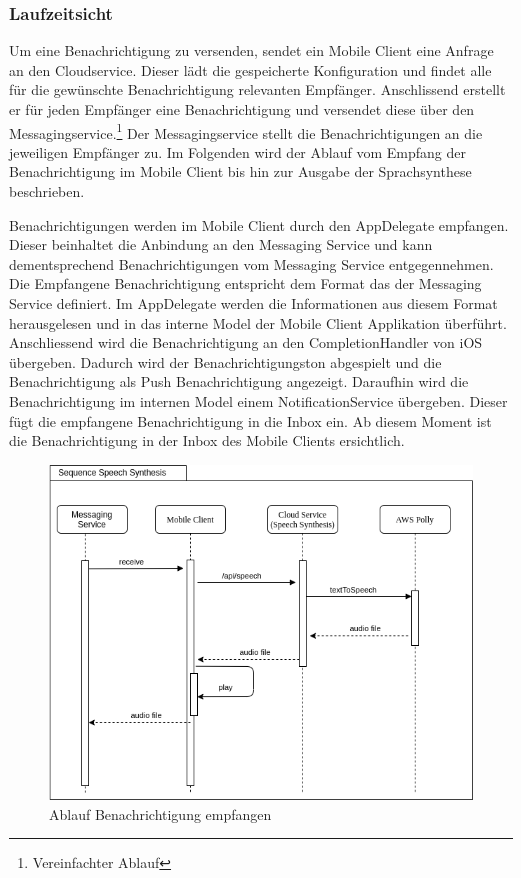 \clearpage
\subsubsection{Laufzeitsicht}

Um eine Benachrichtigung zu versenden, sendet ein Mobile Client eine Anfrage an den Cloudservice.
Dieser lädt die gespeicherte Konfiguration und findet alle für die gewünschte Benachrichtigung relevanten Empfänger.
Anschlissend erstellt er für jeden Empfänger eine Benachrichtigung und versendet diese über den Messagingservice.\cite{ip5}\footnote{Vereinfachter Ablauf}
Der Messagingservice stellt die Benachrichtigungen an die jeweiligen Empfänger zu.
Im Folgenden wird der Ablauf vom Empfang der Benachrichtigung im Mobile Client bis hin zur Ausgabe der Sprachsynthese beschrieben.

Benachrichtigungen werden im Mobile Client durch den AppDelegate empfangen.
Dieser beinhaltet die Anbindung an den Messaging Service und kann dementsprechend Benachrichtigungen vom Messaging Service entgegennehmen.
Die Empfangene Benachrichtigung entspricht dem Format das der Messaging Service definiert.
Im AppDelegate werden die Informationen aus diesem Format herausgelesen und in das interne Model der Mobile Client Applikation überführt.
Anschliessend wird die Benachrichtigung an den CompletionHandler von iOS übergeben.
Dadurch wird der Benachrichtigungston abgespielt und die Benachrichtigung als Push Benachrichtigung angezeigt.
Daraufhin wird die Benachrichtigung im internen Model einem NotificationService übergeben.
Dieser fügt die empfangene Benachrichtigung in die Inbox ein.
Ab diesem Moment ist die Benachrichtigung in der Inbox des Mobile Clients ersichtlich.

\begin{figure}[h]
    \centering
    \begin{minipage}[b]{0.9\textwidth}
        \includegraphics[width=\textwidth]{graphics/diagramms/Sequence_Speech_Synth_V01}
        \caption{Ablauf Benachrichtigung empfangen}
    \end{minipage}
\end{figure}


